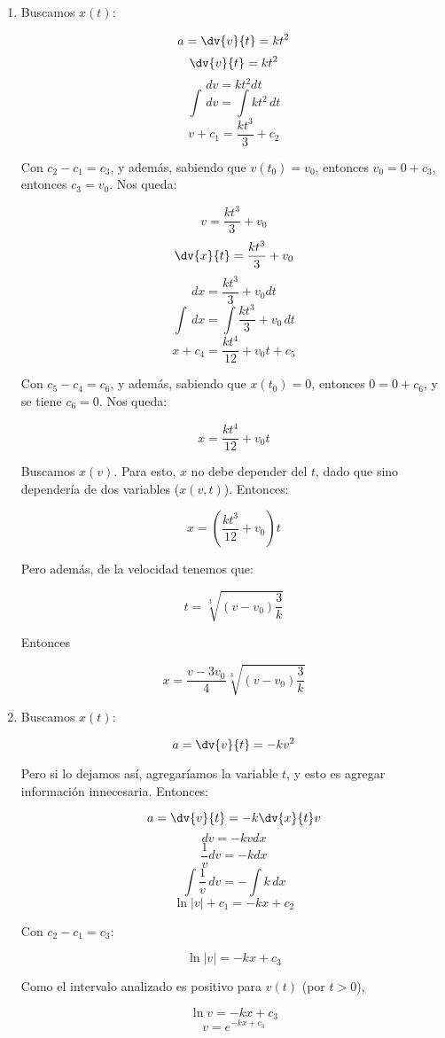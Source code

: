 \begin{enumerate}

\item

	Buscamos $x(t)$:
	
	$$ a = \dv{v}{t} = kt^2 $$
	$$ \dv{v}{t} = kt^2 $$
	$$ dv = kt^2 dt $$
	$$ \int \! \, dv = \int \! kt^2 \, dt $$
	$$ v + c_1 = \frac{kt^3}{3} + c_2 $$
	
	Con $c_2 - c_1 = c_3$, y adem\'as, sabiendo que $v(t_0) = v_0$, entonces $v_0 = 0 + c_3$, entonces $c_3 = v_0$. Nos queda:
	
	$$ v = \frac{kt^3}{3} + v_0 $$
	$$ \dv{x}{t} = \frac{kt^3}{3} + v_0 $$
	$$ dx = \frac{kt^3}{3} + v_0 dt $$
	$$ \int \! \, dx = \int \! \frac{kt^3}{3} + v_0 \, dt $$
	$$ x + c_4 = \frac{kt^4}{12} + v_0t + c_5$$
	
	Con $c_5 - c_4 = c_6$, y adem\'as, sabiendo que $x(t_0) = 0$, entonces $0 = 0 + c_6$, y se tiene $c_6 = 0$. Nos queda:
	
	$$ x = \frac{kt^4}{12} + v_0t$$
	
	Buscamos $x(v)$. Para esto, $x$ no debe depender del $t$, dado que sino depender\'ia de dos variables ($x(v,t)$). Entonces:
	
	$$ x = \left(\frac{kt^3}{12} + v_0 \right)t $$
	
	Pero adem\'as, de la velocidad tenemos que:
	
	$$ t = \sqrt[3]{\left( v - v_0 \right)\frac{3}{k}} $$
	
	Entonces
	
	$$ x = \frac{v - 3v_0}{4} \sqrt[3]{\left( v - v_0 \right)\frac{3}{k}} $$

\item

	Buscamos $x(t)$:
	
	$$ a = \dv{v}{t} = -kv^2 $$
	
	Pero si lo dejamos as\'i, agregar\'iamos la variable $t$, y esto es agregar informaci\'on innecesaria. Entonces:
	
	$$ a = \dv{v}{t} = -k\dv{x}{t}v $$
	$$ dv = -kvdx $$
	$$ \frac{1}{v}dv = -kdx $$
	$$ \int \! \frac{1}{v} \, dv = - \int \! k \, dx $$
	$$ \ln\left| v \right| + c_1 = -kx + c_2 $$
	
	Con $c_2 - c_1 = c_3$:
	
	$$ \ln\left| v \right| = -kx + c_3 $$

	Como el intervalo analizado es positivo para $v(t)$ (por $t > 0$),	
	
	$$ \ln v = -kx + c_3 $$
	$$ v = e^{-kx + c_3} $$
	

\end{enumerate}
